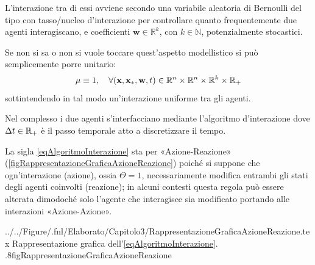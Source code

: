         L'interazione tra di essi avviene secondo una variabile aleatoria di Bernoulli del tipo
        con tasso/nucleo d'interazione 
        per controllare quanto frequentemente due agenti interagiscano, e coefficienti \(\mathbf w\in\mathbb R^k\), con \(k\in\mathbb N\), potenzialmente stocastici.%
        \begin{oss}
          Se non si sa o non si vuole toccare quest'aspetto modellistico si può semplicemente porre unitario:
          \[
            \mu\equiv1,\quad\forall(\mathbf x,\mathbf x_*,\mathbf w,t)
            \in\mathbb R^n\times\mathbb R^n\times\mathbb R^k\times\mathbb R_+
          \]
          sottintendendo in tal modo un'interazione uniforme tra gli agenti.
        \end{oss}
        
        Nel complesso i due agenti s'interfacciano mediante l'algoritmo d'interazione
        dove \(\Delta t\in\mathbb R_+\) è il passo temporale atto a discretizzare il tempo.

        \begin{oss}
          \label{ossAlgoritmoAzioneReazione}
          La sigla \ref{eqAlgoritmoInterazione} sta per «Azione-Reazione» (\cref{figRappresentazioneGraficaAzioneReazione}) poiché si suppone che ogn'interazione (azione), ossia \(\Theta=1\), necessariamente modifica entrambi gli stati degli agenti coinvolti (reazione); in alcuni contesti \cite[(2.5) p. 5]{Nurisso2024} questa regola può essere alterata dimodoché solo l'agente che interagisce sia modificato portando alle interazioni «Azione-Azione».
        \end{oss}

          {../../Figure/.fnl/Elaborato/Capitolo3/RappresentazioneGraficaAzioneReazione.tex}
          {Rappresentazione grafica dell'\ref{eqAlgoritmoInterazione}.}
          {.8\linewidth}{figRappresentazioneGraficaAzioneReazione}

